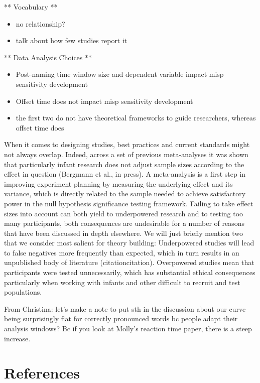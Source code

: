 \documentclass[man]{apa6}
\providecommand{\tightlist}{%
  \setlength{\itemsep}{0pt}\setlength{\parskip}{0pt}}
\theoremstyle{definition}
\theoremstyle{definition}
\theoremstyle{definition}
\theoremstyle{remark}
\begin{document}
** Vocabulary **

\begin{itemize}
\tightlist
\item
  no relationship?
\item
  talk about how few studies report it
\end{itemize}

** Data Analysis Choices **

\begin{itemize}
\tightlist
\item
  Post-naming time window size and dependent variable impact misp
  sensitivity development
\item
  Offset time does not impact misp sensitivity development
\item
  the first two do not have theoretical frameworks to guide researchers,
  whereas offset time does
\end{itemize}

When it comes to designing studies, best practices and current standards
might not always overlap. Indeed, across a set of previous meta-analyses
it was shown that particularly infant research does not adjust sample
sizes according to the effect in question (Bergmann et al., in press). A
meta-analysis is a first step in improving experiment planning by
measuring the underlying effect and its variance, which is directly
related to the sample needed to achieve satisfactory power in the null
hypothesis significance testing framework. Failing to take effect sizes
into account can both yield to underpowered research and to testing too
many participants, both consequences are undesirable for a number of
reasons that have been discussed in depth elsewhere. We will just
briefly mention two that we consider most salient for theory building:
Underpowered studies will lead to false negatives more frequently than
expected, which in turn results in an unpublished body of literature
(citationcitation). Overpowered studies mean that participants were
tested unnecessarily, which has substantial ethical consequences
particularly when working with infants and other difficult to recruit
and test populations.

From Christina: let's make a note to put sth in the discussion about our
curve being surprisingly flat for correctly pronounced words bc people
adapt their analysis windows? Bc if you look at Molly's reaction time
paper, there is a steep increase.

\newpage

\section{References}\label{references}

\begingroup
\setlength{\parindent}{-0.5in} \setlength{\leftskip}{0.5in}

\hypertarget{refs}{}

\endgroup
\end{document}
